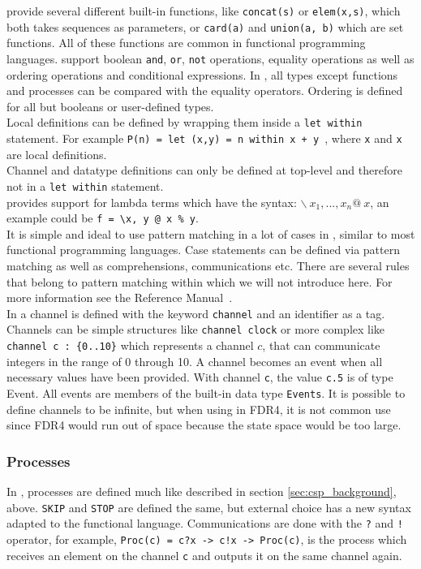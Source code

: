 \cspm{} provide several different built-in functions, like \texttt{concat(s)} or \texttt{elem(x,s)}, which both takes sequences as parameters, or \texttt{card(a)} and \texttt{union(a, b)} which are set functions. All of these functions are common in functional programming languages. \cspm{} support boolean \texttt{and}, \texttt{or}, \texttt{not} operations, equality operations as well as ordering operations and conditional expressions. In \cspm, all types except functions and processes can be compared with the equality operators. Ordering is defined for all but booleans or user-defined types. \\

Local definitions can be defined by wrapping them inside a \texttt{let within} statement. For example \texttt{P(n) = let (x,y) = n within x + y }, where \texttt{x} and \texttt{x} are local definitions.\\ Channel and datatype definitions can only be defined at top-level and therefore not in a \texttt{let within} statement. \\
\cspm{} provides support for lambda terms which have the syntax: $\backslash \  x_1,...,x_n @\ x$, an example could be \texttt{f = \textbackslash x, y @ x \% y}. \\
It is simple and ideal to use pattern matching in a lot of cases in \cspm, similar to most functional programming languages. Case statements can be defined via pattern matching as well as comprehensions, communications etc. There are several rules that belong to pattern matching within \cspm{} which we will not introduce here. For more information see the \cspm{} Reference Manual~\cite{Scattergood2011}.\\

In \cspm{} a channel is defined with the keyword \texttt{channel} and an identifier as a tag. Channels can be simple structures like \texttt{channel clock} or more complex like \texttt{channel c : \{0..10\}} which represents a channel $c$, that can communicate integers in the range of 0 through 10. A channel becomes an event when all necessary values have been provided. With channel \texttt{c}, the value \texttt{c.5} is of type Event. All events are members of the built-in data type \texttt{Events}. It is possible to define channels to be infinite, but when using \cspm{} in FDR4, it is not common use since FDR4 would run out of space because the state space would be too large.

\subsubsection{\cspm{} Processes}
In \cspm{}, processes are defined much like described in section \ref{sec:csp_background}, above. \texttt{SKIP} and \texttt{STOP} are defined the same, but external choice has a new syntax adapted to the functional language. Communications are done with the \texttt{?} and \texttt{!} operator, for example, \texttt{Proc(c) = c?x -> c!x -> Proc(c)}, is the process which receives an element on the channel \texttt{c} and outputs it on the same channel again.

